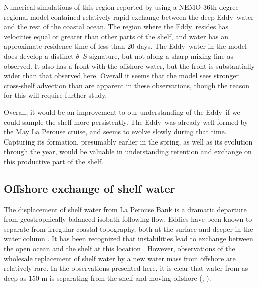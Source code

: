 \documentclass[draft]{agujournal2019}
\newcommand*{\Eddy}{{\sc Eddy}}
\begin{document}
Numerical simulations of this region reported by \cite{sahuetal22} using a NEMO
36th-degree regional model contained relatively rapid exchange between the deep
\Eddy\ water and the rest of the coastal ocean.  The region where the \Eddy\
resides has velocities equal or greater than other parts of the shelf, and
water has an approximate residence time of less than 20 days.  The \Eddy\ water
in the model does develop a distinct $\theta$--$S$ signature, but not along a
sharp mixing line as observed.  It also has a front with the offshore water,
but the front is substantially wider than that observed here.  Overall it seems
that the model sees stronger cross-shelf advection than are apparent in these
observations, though the reason for this will require further study.

Overall, it would be an improvement to our understanding of the \Eddy\ if we
could sample the shelf more persistently.  The \Eddy\ was already well-formed
by the May La Perouse cruise, and seems to evolve slowly during that time.
Capturing its formation, presumably earlier in the spring, as well as its
evolution through the year, would be valuable in understanding retention and
exchange on this productive part of the shelf.

\subsection{Offshore exchange of shelf water}

The displacement of shelf water from La Perouse Bank is a dramatic departure from geostrophically balanced isobath-following flow.  Eddies have been known to separate from irregular coastal topography, both at the surface \cite{barthetal00} and deeper in the water column \cite{pellandetal13}.   It has been recognized that instabilities lead to exchange between the open ocean and the shelf at this location \cite{ikedaemery84, ikedaemery84}.   However, observations of the wholesale replacement of shelf water by a new water mass from offshore are relatively rare. In the  observations presented here, it is clear that water from as deep as 150 m is separating from the shelf and moving offshore (, ).
\end{document}
